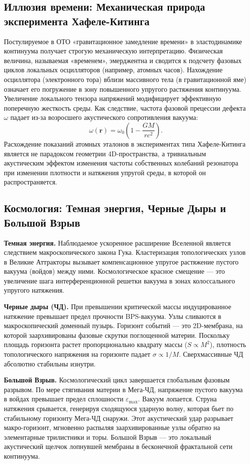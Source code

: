 \documentclass[11pt,a4paper]{article}
\begin{document}
\subsection{Иллюзия времени: Механическая природа эксперимента Хафеле-Китинга}
Постулируемое в ОТО «гравитационное замедление времени» в эластодинамике континуума получает строгую механическую интерпретацию. Физическая величина, называемая «временем», эмерджентна и сводится к подсчету фазовых циклов локальных осцилляторов (например, атомных часов). 
Нахождение осциллятора (электронного тора) вблизи массивного тела (в гравитационной яме) означает его погружение в зону повышенного упругого растяжения континуума. Увеличение локального тензора напряжений модифицирует эффективную поперечную жесткость среды. 
Как следствие, частота фазовой прецессии дефекта $\omega$ падает из-за возросшего акустического сопротивления вакуума:
\begin{equation}
	\omega(\mathbf{r}) = \omega_0 \left( 1 - \frac{GM}{rc^2} \right).
\end{equation}
Расхождение показаний атомных эталонов в экспериментах типа Хафеле-Китинга является не парадоксом геометрии 4D-пространства, а тривиальным акустическим эффектом изменения частоты собственных колебаний резонатора при изменении плотности и натяжения упругой среды, в которой он распространяется.

\subsection{Космология: Темная энергия, Черные Дыры и Большой Взрыв}
\textbf{Темная энергия.} Наблюдаемое ускоренное расширение Вселенной является следствием макроскопического закона Гука. Кластеризация топологических узлов в Великие Аттракторы вызывает компенсационное упругое растяжение пустого вакуума (войдов) между ними. Космологическое красное смещение — это увеличение шага интерференционной решетки вакуума в зонах колоссального упругого натяжения.

\textbf{Черные дыры (ЧД).} При превышении критической массы индуцированное натяжение превышает предел прочности BPS-вакуума. Узлы сливаются в макроскопический доменный пузырь. Горизонт событий — это 2D-мембрана, на которой заархивированы фазовые скрутки поглощенной материи. Поскольку площадь горизонта растет пропорционально квадрату массы ($S \propto M^2$), плотность топологического напряжения на горизонте падает $\sigma \propto 1/M$. Сверхмассивные ЧД абсолютно стабильны изнутри.

\textbf{Большой Взрыв.} Космологический цикл завершается глобальным фазовым разрывом. По мере стягивания материи в Мега-ЧД, напряжение пустого вакуума в войдах превышает предел сплошности $\varepsilon_{\text{max}}$. Вакуум лопается. Струна натяжения срывается, генерируя сходящуюся ударную волну, которая бьет по стабильному горизонту Мега-ЧД снаружи. Этот акустический удар разрывает макро-горизонт, мгновенно распыляя заархивированные узлы обратно на элементарные трилистники и торы. Большой Взрыв — это локальный акустический щелчок лопнувшей мембраны в бесконечной фрактальной сети континуума.
\end{document}
